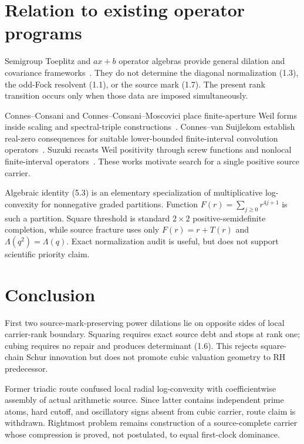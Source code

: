 \documentclass[11pt]{article}
\theoremstyle{definition}
\theoremstyle{remark}
\begin{document}
\section{Relation to existing operator programs}

Semigroup Toeplitz and $ax+b$ operator algebras provide general dilation and covariance
frameworks~\cite{BrownloweEtAl2010,LacaSehnem2022}.  They do not determine the diagonal
normalization (1.3), the odd-Fock resolvent (1.1), or the source mark (1.7).  The present rank
transition occurs only when those data are imposed simultaneously.

Connes--Consani and Connes--Consani--Moscovici place finite-aperture Weil forms inside scaling and
spectral-triple constructions~\cite{ConnesConsani2020,CCM2025}.  Connes--van Suijlekom establish
real-zero consequences for suitable lower-bounded finite-interval convolution
operators~\cite{ConnesVanSuijlekom2025}.  Suzuki recasts Weil positivity through screw functions
and nonlocal finite-interval operators~\cite{Suzuki2026}. These works motivate search for a
single positive source carrier.

Algebraic identity (5.3) is an elementary specialization of multiplicative log-convexity for
nonnegative graded partitions. Function $F(r)=\sum_{j\geq0}r^{4j+1}$ is such a partition.
Square threshold is standard $2\times2$ positive-semidefinite completion, while source fracture
uses only $F(r)=r+T(r)$ and $\Lambda(q^2)=\Lambda(q)$. Exact normalization audit is useful, but
does not support scientific priority claim.

\section{Conclusion}

First two source-mark-preserving power dilations lie on opposite sides of local carrier-rank
boundary. Squaring requires exact source debt and stops at rank one; cubing requires no repair and
produces determinant (1.6). This rejects square-chain Schur innovation but does not promote cubic
valuation geometry to RH predecessor.

Former triadic route confused local radial log-convexity with coefficientwise assembly of actual
arithmetic source. Since latter contains independent prime atoms, hard cutoff, and oscillatory
signs absent from cubic carrier, route claim is withdrawn. Rightmost problem remains construction
of a source-complete carrier whose compression is proved, not postulated, to equal first-clock
dominance.
\end{document}
